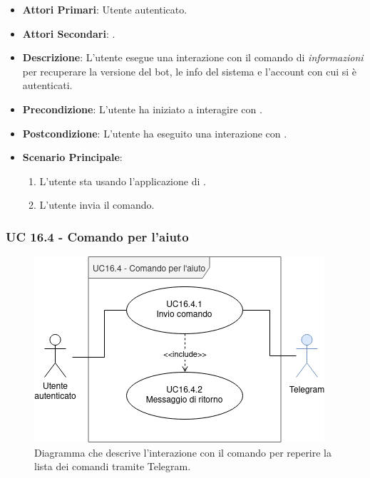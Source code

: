 	\begin{itemize}
		\item \textbf{Attori Primari}: Utente autenticato.
		\item \textbf{Attori Secondari}: .
		\item \textbf{Descrizione}: L'utente esegue una interazione con il comando di \textit{informazioni} per recuperare la versione del bot, le info del sistema e l'account con cui si è autenticati.
		\item \textbf{Precondizione}: L'utente ha iniziato a interagire con .
		\item \textbf{Postcondizione}: L'utente ha eseguito una interazione con .
		\item \textbf{Scenario Principale}:
		\begin{enumerate}
			\item L'utente sta usando l'applicazione di . 
			\item L'utente invia il comando.
		\end{enumerate}
	\end{itemize}



	\subsubsection{UC 16.4 - Comando per l'aiuto}

	\begin{figure}[H]
		\centering
		\includegraphics[scale=0.60]{res/images/uc16.4}
		\caption{Diagramma che descrive l'interazione con il comando per reperire la lista dei comandi tramite Telegram.}
	\end{figure}

